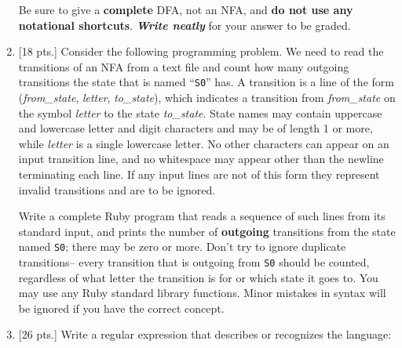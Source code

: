 \documentclass[11pt]{article}
\begin{document}
\begin{enumerate}
          Be sure to give a \textbf{complete} DFA, not an NFA, and
          \textbf{do not use any notational shortcuts}.  \emph{\textbf{Write
          neatly}} for your answer to be graded.


          \pagebreak


    \item {[18 pts.]} Consider the following programming problem.  We need
          to read the transitions of an NFA from a text file and count how
          many outgoing transitions the state that is named ``\texttt{S0}''
          has.  A transition is a line of the form (\emph{from\_state},
          \emph{letter}, \emph{to\_state}), which indicates a transition
          from \emph{from\_state} on the symbol \emph{letter} to the state
          \emph{to\_state}.  State names may contain uppercase and lowercase
          letter and digit characters and may be of length 1 or more, while
          \emph{letter} is a single lowercase letter.  No other characters
          can appear on an input transition line, and no whitespace may
          appear other than the newline terminating each line.  If any input
          lines are not of this form they represent invalid transitions and
          are to be ignored.

          Write a complete Ruby program that reads a sequence of such lines
          from its standard input, and prints the number of
          \textbf{outgoing} transitions from the state named \texttt{S0};
          there may be zero or more.  Don't try to ignore duplicate
          transitions-- every transition that is outgoing from \texttt{S0}
          should be counted, regardless of what letter the transition is for
          or which state it goes to.  You may use any Ruby standard library
          functions.  Minor mistakes in syntax will be ignored if you have
          the correct concept.

          \pagebreak


    \item {[26 pts.]} \label{re-problem} Write a regular expression that
          describes or recognizes the language:

          \begin{centering}


\end{centering}
\end{enumerate}
\end{document}

